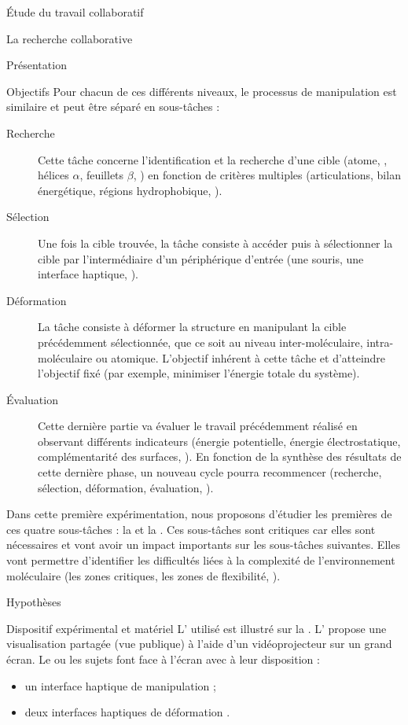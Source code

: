 \documentclass[myfrancais]{mythesis}
\begin{document}
\begin{mypart}{Étude du travail collaboratif}
\begin{mychapter}{La recherche collaborative}
\begin{mysection}{Présentation}
\begin{mysubsection}{Objectifs}
					Pour chacun de ces différents niveaux, le processus de manipulation est similaire et peut être séparé en sous-tâches :
					\begin{description}
						\item[Recherche] Cette tâche concerne l'identification et la recherche d'une cible (atome, , hélices $\alpha$, feuillets $\beta$, \myetc) en fonction de critères multiples (articulations, bilan énergétique, régions hydrophobique, \myetc).
						\item[Sélection] Une fois la cible trouvée, la tâche consiste à accéder puis à sélectionner la cible par l'intermédiaire d'un périphérique d'entrée (une souris, une interface haptique, \myetc).
						\item[Déformation] La tâche consiste à déformer la structure en manipulant la cible précédemment sélectionnée, que ce soit au niveau inter-moléculaire, intra-moléculaire ou atomique.
							L'objectif inhérent à cette tâche et d'atteindre l'objectif fixé (par exemple, minimiser l'énergie totale du système).
						\item[Évaluation] Cette dernière partie va évaluer le travail précédemment réalisé en observant différents indicateurs (énergie potentielle, énergie électrostatique, complémentarité des surfaces, \myetc).
							En fonction de la synthèse des résultats de cette dernière phase, un nouveau cycle pourra recommencer (recherche, sélection, déformation, évaluation, \myetc).
					\end{description}

					Dans cette première expérimentation, nous proposons d'étudier les premières de ces quatre sous-tâches : la  et la .
					Ces sous-tâches sont critiques car elles sont nécessaires et vont avoir un impact importants sur les sous-tâches suivantes.
					Elles vont permettre d'identifier les difficultés liées à la complexité de l'environnement moléculaire (les zones critiques, les zones de flexibilité, \myetc).
				\end{mysubsection}
				\begin{mysubsection}{Hypothèses}
				\end{mysubsection}
			\end{mysection}
			\begin{mysection}{Dispositif expérimental et matériel}
				L' utilisé est illustré sur la .
				L' propose une visualisation partagée (vue publique) à l'aide d'un vidéoprojecteur sur un grand écran.
				Le ou les sujets font face à l'écran avec à leur disposition :
				\begin{itemize}
					\item un interface haptique de manipulation ;
					\item deux interfaces haptiques de déformation .
				\end{itemize}


\end{mysection}
\end{mychapter}
\end{mypart}
\end{document}
